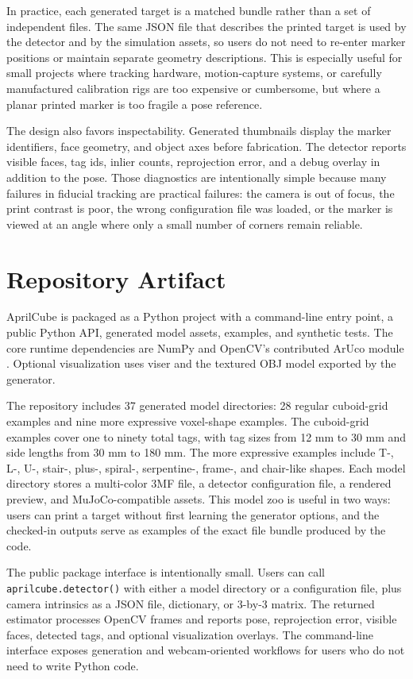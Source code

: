 \documentclass[conference]{IEEEtran}
\begin{document}
In practice, each generated target is a matched bundle rather than a set of independent files. The same JSON file that describes the printed target is used by the detector and by the simulation assets, so users do not need to re-enter marker positions or maintain separate geometry descriptions. This is especially useful for small projects where tracking hardware, motion-capture systems, or carefully manufactured calibration rigs are too expensive or cumbersome, but where a planar printed marker is too fragile a pose reference.

The design also favors inspectability. Generated thumbnails display the marker identifiers, face geometry, and object axes before fabrication. The detector reports visible faces, tag ids, inlier counts, reprojection error, and a debug overlay in addition to the pose. Those diagnostics are intentionally simple because many failures in fiducial tracking are practical failures: the camera is out of focus, the print contrast is poor, the wrong configuration file was loaded, or the marker is viewed at an angle where only a small number of corners remain reliable.

\section{Repository Artifact}
AprilCube is packaged as a Python project with a command-line entry point, a public Python API, generated model assets, examples, and synthetic tests. The core runtime dependencies are NumPy and OpenCV's contributed ArUco module \cite{opencv}. Optional visualization uses viser and the textured OBJ model exported by the generator.

The repository includes 37 generated model directories: 28 regular cuboid-grid examples and nine more expressive voxel-shape examples. The cuboid-grid examples cover one to ninety total tags, with tag sizes from 12 mm to 30 mm and side lengths from 30 mm to 180 mm. The more expressive examples include T-, L-, U-, stair-, plus-, spiral-, serpentine-, frame-, and chair-like shapes. Each model directory stores a multi-color 3MF file, a detector configuration file, a rendered preview, and MuJoCo-compatible assets. This model zoo is useful in two ways: users can print a target without first learning the generator options, and the checked-in outputs serve as examples of the exact file bundle produced by the code.

The public package interface is intentionally small. Users can call \texttt{aprilcube.detector()} with either a model directory or a configuration file, plus camera intrinsics as a JSON file, dictionary, or 3-by-3 matrix. The returned estimator processes OpenCV frames and reports pose, reprojection error, visible faces, detected tags, and optional visualization overlays. The command-line interface exposes generation and webcam-oriented workflows for users who do not need to write Python code.
\end{document}
